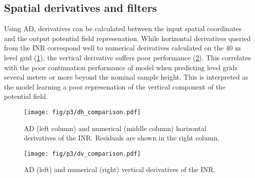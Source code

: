 \documentclass[manuscript.tex]{subfiles}
\begin{document}



\subsection{Spatial derivatives and filters}
Using AD, derivatives can be calculated between the input spatial coordinates and the output potential field represenation.
While horizontal derivatives queried from the INR correspond well to numerical derivatives calculated on the 40 m level grid (\cref{fig:hori_grad}), the vertical derivative suffers poor performance (\cref{fig:vert_grad}).
This correlates with the poor continuation performance of model when predicting level grids several meters or more beyond the nominal sample height.
This is interpreted as the model learning a poor represenation of the vertical component of the potential field.

\begin{figure}[hbt]
    \centering
    \texttt{[image: fig/p3/dh\_comparison.pdf]}
    \caption[Horizontal derivatives]{AD (left column) and numerical (middle column) horizontal derivatives of the INR\@. Residuals are shown in the right column.}
    \label{fig:hori_grad}
\end{figure}

\begin{figure}[hbt]
    \centering
    \texttt{[image: fig/p3/dv\_comparison.pdf]}
    \caption[Vertical derivative]{AD (left) and numerical (right) vertical derivatives of the INR\@.}
    \label{fig:vert_grad}
\end{figure}


\end{document}
